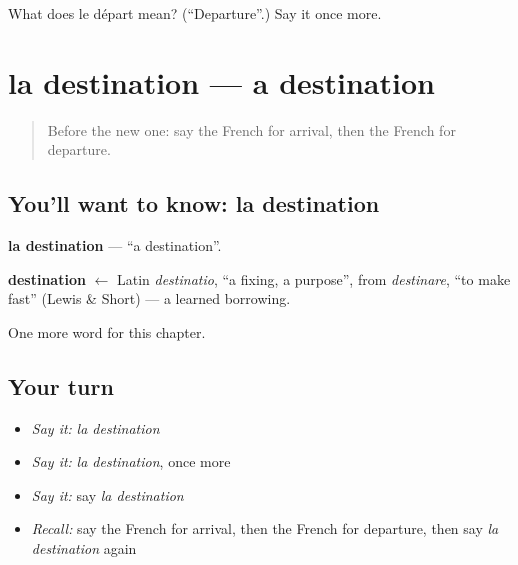 \begin{tcolorbox}[breakable,colback=teal!4,colframe=teal!35!black,title={Before you move on}]
What does le départ mean? (\textquotedblleft{}Departure\textquotedblright{}.) Say it once more.
\end{tcolorbox}
\section[la destination]{la destination — a destination}

\label{lesson:FR-C231-destination}



\begin{quote}
Before the new one: say the French for arrival, then the French for departure.
\end{quote}

\subsection*{You'll want to know: la destination}
\textbf{la destination} — \textquotedblleft{}a destination\textquotedblright{}.

\begin{cousinweb}
\textbf{destination} $\leftarrow$ Latin \emph{destinatio}, \textquotedblleft{}a fixing, a purpose\textquotedblright{}, from \emph{destinare}, \textquotedblleft{}to make fast\textquotedblright{} (Lewis \& Short) — a learned borrowing.
\end{cousinweb}

\begin{grammarlens}[title={What you've built}]
One more word for this chapter.
\end{grammarlens}

\subsection*{Your turn}
\begin{itemize}
\raggedright
  \item \emph{Say it:} \emph{la destination}
  \item \emph{Say it:} \emph{la destination}, once more
  \item \emph{Say it:} say \emph{la destination}
  \item \emph{Recall:} say the French for arrival, then the French for departure, then say \emph{la destination} again
\end{itemize}

